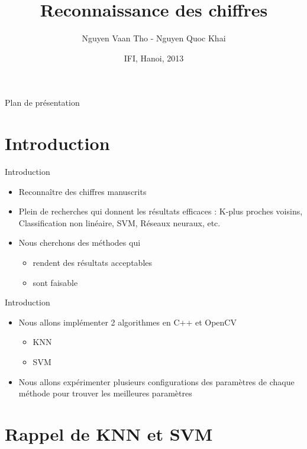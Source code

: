 \documentclass[12pt]{beamer}
\title{Reconnaissance des chiffres}
\author{Nguyen Vaan Tho - Nguyen Quoc Khai}
\date{IFI, Hanoi, 2013}
\begin{document}
\begin{frame}
  \titlepage
\end{frame}

\begin{frame}{Plan de présentation}
  \tableofcontents
\end{frame}

\section{Introduction}
\begin{frame}{Introduction}
  \begin{itemize}
  \item Reconnaître des chiffres manuscrits
  \item Plein de recherches qui donnent les résultats efficaces : K-plus proches voisins, Classification non linéaire, SVM, Réseaux neuraux, etc.
  \item Nous cherchons des méthodes qui
  \begin{itemize}
   \item rendent des résultats acceptables
   \item sont faisable
  \end{itemize}
  \end{itemize}
  
\end{frame}


\begin{frame}{Introduction}
  \begin{itemize}
  \item Nous allons implémenter 2 algorithmes en C++ et OpenCV
  \begin{itemize}
   \item KNN 
   \item SVM 
  \end{itemize}
  \item Nous allons expérimenter plusieurs configurations des paramètres de chaque 
méthode pour trouver les meilleures paramètres 
  \end{itemize}
  
\end{frame}

\section{Rappel de KNN et SVM}
\end{document}
